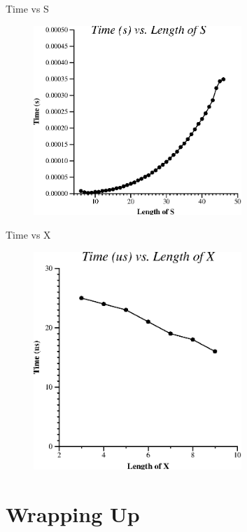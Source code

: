 \documentclass[10pt]{beamer}
\begin{document}
\begin{frame}{Time vs S}
  \begin{figure}[ht!]
    \centering
    \includegraphics[width=0.7\textwidth]{../figures/vary_s.ps}
  \end{figure}
\end{frame}

\begin{frame}{Time vs X}
  \begin{figure}[ht!]
    \centering
    \includegraphics[width=0.7\textwidth]{../figures/vary_x.ps}
  \end{figure}
\end{frame}

\section{Wrapping Up}
\end{document}

